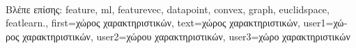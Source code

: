 {{%
		\\
		\foreignlanguage{greek}{Βλέπε επίσης:} \gls{feature}, \gls{ml}, \gls{featurevec}, \gls{datapoint}, \gls{convex}, 
		\gls{graph}, \gls{euclidspace}, \gls{featlearn}.},
	first={\foreignlanguage{greek}{χώρος χαρακτηριστικών}},
	text={\foreignlanguage{greek}{χώρος χαρακτηριστικών}},
	user1={\foreignlanguage{greek}{χώρος χαρακτηριστικών}}, %
  	user2={\foreignlanguage{greek}{χώρου χαρακτηριστικών}}, %
	user3={\foreignlanguage{greek}{χώρο χαρακτηριστικών}} %
}

